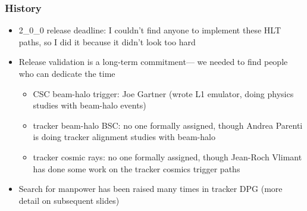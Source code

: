 \documentclass[compress]{beamer}
\begin{document}
\begin{frame}
\frametitle{History}
\small

\begin{itemize}\setlength{\itemsep}{0.25 cm}
\item 2\_0\_0 release deadline: I couldn't find anyone to implement these HLT paths, so I did it because it didn't look too hard
\item Release validation is a long-term commitment--- we needed to find people who can dedicate the time
\begin{itemize}\setlength{\itemsep}{0.25 cm}
\item CSC beam-halo trigger: Joe Gartner (wrote L1 emulator, doing physics studies with beam-halo events)
\item tracker beam-halo BSC: no one formally assigned, though Andrea Parenti is doing tracker alignment studies with beam-halo
\item tracker cosmic rays: no one formally assigned, though Jean-Roch Vlimant has done some work on the tracker cosmics trigger paths
\end{itemize}
\item Search for manpower has been raised many times in tracker DPG (more detail on subsequent slides)
\end{itemize}
\end{frame}
\end{document}
